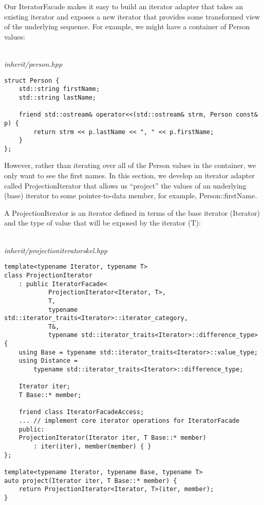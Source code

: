 Our IteratorFacade makes it easy to build an iterator adapter that takes an existing iterator and exposes a new iterator that provides some transformed view of the underlying sequence. For example, we might have a container of Person values:

\hspace*{\fill} \\ %
\noindent
\textit{inherit/person.hpp}
\begin{lstlisting}[style=styleCXX]
struct Person {
	std::string firstName;
	std::string lastName;
	
	friend std::ostream& operator<<(std::ostream& strm, Person const& p) {
		return strm << p.lastName << ", " << p.firstName;
	}
};
\end{lstlisting}

However, rather than iterating over all of the Person values in the container, we only want to see the first names. In this section, we develop an iterator adapter called ProjectionIterator that allows us “project” the values of an underlying (base) iterator to some pointer-to-data member, for example, Person::firstName.

A ProjectionIterator is an iterator defined in terms of the base iterator (Iterator) and the type of value that will be exposed by the iterator (T):

\hspace*{\fill} \\ %
\noindent
\textit{inherit/projectioniteratorskel.hpp}
\begin{lstlisting}[style=styleCXX]
template<typename Iterator, typename T>
class ProjectionIterator
	: public IteratorFacade<
			ProjectionIterator<Iterator, T>,
			T,
			typename std::iterator_traits<Iterator>::iterator_category,
			T&,
			typename std::iterator_traits<Iterator>::difference_type>
{
	using Base = typename std::iterator_traits<Iterator>::value_type;
	using Distance =
		typename std::iterator_traits<Iterator>::difference_type;
	
	Iterator iter;
	T Base::* member;
	
	friend class IteratorFacadeAccess;
	... // implement core iterator operations for IteratorFacade
	public:
	ProjectionIterator(Iterator iter, T Base::* member)
		: iter(iter), member(member) { }
};

template<typename Iterator, typename Base, typename T>
auto project(Iterator iter, T Base::* member) {
	return ProjectionIterator<Iterator, T>(iter, member);
}
\end{lstlisting}

